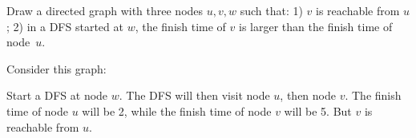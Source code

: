 \begin{prob}
    Draw a directed graph with three nodes $u,v,w$ such that: 1) $v$ is
    reachable from $u$; 2) in a DFS started at $w$, the finish time of $v$
    is larger than the finish time of node~$u$.

    \begin{soln}
        Consider this graph:

        \begin{center}
        \end{center}

        Start a DFS at node $w$. The DFS will then visit node $u$, then
        node $v$. The finish time of node $u$ will be 2, while the finish time
        of node $v$ will be 5. But $v$ is reachable from $u$.
    \end{soln}

\end{prob}
